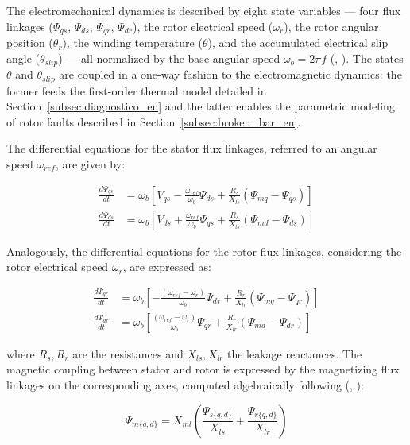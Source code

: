 \documentclass[a4paper]{ifacconf}
\begin{document}
The electromechanical dynamics is described by eight state variables --- four flux linkages ($\Psi_{qs},\,\Psi_{ds},\,\Psi_{qr},\,\Psi_{dr}$), the rotor electrical speed ($\omega_r$), the rotor angular position ($\theta_r$), the winding temperature ($\theta$), and the accumulated electrical slip angle ($\theta_{slip}$) --- all normalized by the base angular speed $\omega_b = 2\pi f$ (\citeauthor{usta2024mathematical}, \citeyear{usta2024mathematical}). The states $\theta$ and $\theta_{slip}$ are coupled in a one-way fashion to the electromagnetic dynamics: the former feeds the first-order thermal model detailed in Section~\ref{subsec:diagnostico_en} and the latter enables the parametric modeling of rotor faults described in Section~\ref{subsec:broken_bar_en}.

The differential equations for the stator flux linkages, referred to an angular speed $\omega_{ref}$, are given by:

\begin{align}
\frac{d\Psi_{qs}}{dt} &= \omega_b \left[V_{qs} - \frac{\omega_{ref}}{\omega_b}\Psi_{ds} + \frac{R_s}{X_{ls}}(\Psi_{mq} - \Psi_{qs})\right] \label{eq:dPsiqs_en} \\[4pt]
\frac{d\Psi_{ds}}{dt} &= \omega_b \left[V_{ds} + \frac{\omega_{ref}}{\omega_b}\Psi_{qs} + \frac{R_s}{X_{ls}}(\Psi_{md} - \Psi_{ds})\right] \label{eq:dPsids_en}
\end{align}

Analogously, the differential equations for the rotor flux linkages, considering the rotor electrical speed $\omega_r$, are expressed as:

\begin{align}
\frac{d\Psi_{qr}}{dt} &= \omega_b \left[-\frac{(\omega_{ref} - \omega_r)}{\omega_b}\Psi_{dr} + \frac{R_r}{X_{lr}}(\Psi_{mq} - \Psi_{qr})\right] \label{eq:dPsiqr_en} \\[4pt]
\frac{d\Psi_{dr}}{dt} &= \omega_b \left[\frac{(\omega_{ref} - \omega_r)}{\omega_b}\Psi_{qr} + \frac{R_r}{X_{lr}}(\Psi_{md} - \Psi_{dr})\right] \label{eq:dPsidr_en}
\end{align}

where $R_s, R_r$ are the resistances and $X_{ls}, X_{lr}$ the leakage reactances. The magnetic coupling between stator and rotor is expressed by the magnetizing flux linkages on the corresponding axes, computed algebraically following (\citeauthor{aktaibi2011dynamic}, \citeyear{aktaibi2011dynamic}):

\begin{equation}
    \Psi_{m\{q,d\}} = X_{ml} \left( \frac{\Psi_{s\{q,d\}}}{X_{ls}} + \frac{\Psi_{r\{q,d\}}}{X_{lr}} \right)
    \label{eq:psim_en}
\end{equation}
\end{document}
